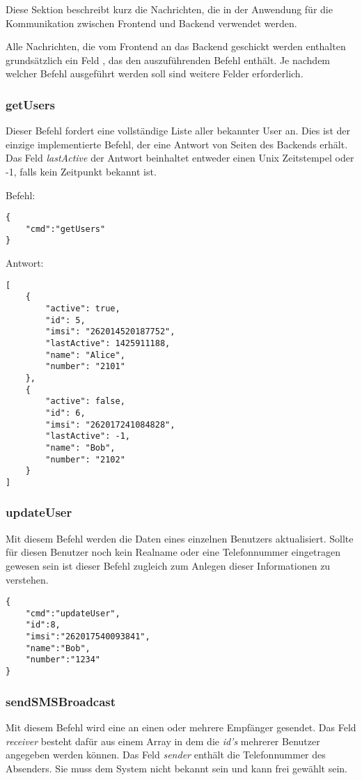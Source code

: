 Diese Sektion beschreibt kurz die \JSON Nachrichten, die in der Anwendung für die Kommunikation zwischen Frontend und Backend verwendet werden.

Alle \JSON Nachrichten, die vom Frontend an das Backend geschickt werden enthalten grundsätzlich ein Feld , das den auszuführenden Befehl enthält. Je nachdem welcher Befehl ausgeführt werden soll sind weitere Felder erforderlich.

\subsubsection*{getUsers}
Dieser Befehl fordert eine vollständige Liste aller bekannter User an. Dies ist der einzige implementierte Befehl, der eine Antwort von Seiten des Backends erhält. Das Feld \textit{lastActive} der Antwort beinhaltet entweder einen Unix Zeitstempel oder -1, falls kein Zeitpunkt bekannt ist.

\textbullet \space Befehl:

\begin{lstlisting}[style=json]
{
	"cmd":"getUsers"
}
\end{lstlisting}

\textbullet \space Antwort:

\begin{lstlisting}[style=json]
[
	{
		"active": true,
		"id": 5,
		"imsi": "262014520187752",
		"lastActive": 1425911188,
		"name": "Alice",
		"number": "2101"
	},
	{
		"active": false,
		"id": 6,
		"imsi": "262017241084828",
		"lastActive": -1,
		"name": "Bob",
		"number": "2102"
	}
]
\end{lstlisting}

\subsubsection*{updateUser}

Mit diesem Befehl werden die Daten eines einzelnen Benutzers aktualisiert. Sollte für diesen Benutzer noch kein Realname oder eine Telefonnummer eingetragen gewesen sein ist dieser Befehl zugleich zum Anlegen dieser Informationen zu verstehen.

\begin{lstlisting}[style=json]
{
	"cmd":"updateUser",
	"id":8,
	"imsi":"262017540093841",
	"name":"Bob",
	"number":"1234"
}
\end{lstlisting}


\subsubsection*{sendSMSBroadcast}
Mit diesem Befehl wird eine \SMS an einen oder mehrere Empfänger gesendet. Das Feld \textit{receiver} besteht dafür aus einem \JSON Array in dem die \textit{id's} mehrerer Benutzer angegeben werden können. Das Feld \textit{sender} enthält die Telefonnummer des Absenders. Sie muss dem System nicht bekannt sein und kann frei gewählt sein.

